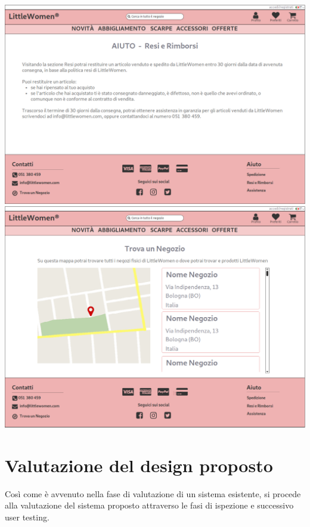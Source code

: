 \documentclass[12pt,a4paper]{report}
\begin{document}
\includegraphics[width=\textwidth]{"Project Management Sources/Wireframe/WireFrame Screenshot/Desktop/22 - Resi e Rimborsi"}
\includegraphics[width=\textwidth]{"Project Management Sources/Wireframe/WireFrame Screenshot/Desktop/23 - Trova un negozio"}
\chapter{Valutazione del design proposto}
Così come è avvenuto nella fase di valutazione di un sistema esistente, si procede alla valutazione del sistema proposto attraverso le fasi di ispezione e successivo user testing.
\end{document}
